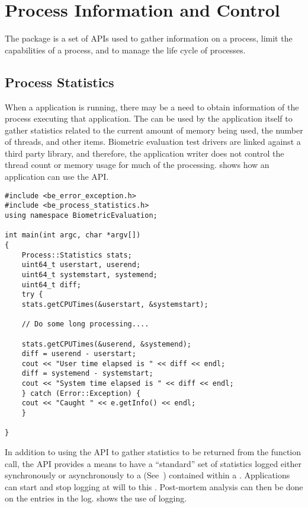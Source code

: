 %
%
\chapter{Process Information and Control}
\label{chp-process}

The  package is a set of APIs used to gather information on
a process, limit the capabilities of a process, and to manage the life cycle
of processes.

\section{Process Statistics}
\label{sec-process_statistics}

When a application is running, there may be a need to obtain information of the
process executing that application. The  can be used
by the application itself to gather statistics related to the current amount
of memory
being used, the number of threads, and other items. Biometric evaluation test
drivers are linked against a third party library, and therefore, the application
writer does not control the thread count or memory usage for much of the
processing.  shows how an application can
use the  API.

\begin{lstlisting}[caption={Gathering Process Statistics}, label=lst:processstatisticsuse]
#include <be_error_exception.h>
#include <be_process_statistics.h>
using namespace BiometricEvaluation;

int main(int argc, char *argv[])
{
    Process::Statistics stats;
    uint64_t userstart, userend;
    uint64_t systemstart, systemend;
    uint64_t diff;
    try {
	stats.getCPUTimes(&userstart, &systemstart);

	// Do some long processing....

	stats.getCPUTimes(&userend, &systemend);
	diff = userend - userstart;
	cout << "User time elapsed is " << diff << endl;
	diff = systemend - systemstart;
	cout << "System time elapsed is " << diff << endl;
    } catch (Error::Exception) {
	cout << "Caught " << e.getInfo() << endl;
    }

}
\end{lstlisting}

In addition to using the  API to gather statistics to be
returned from
the function call, the API provides a means to have a ``standard'' set of
statistics logged either synchronously or asynchronously to a 
 (See~) contained within a .
Applications can
start and stop logging at will to this . Post-mortem analysis can
then be done on the entries in the log.
 shows the use of logging.

